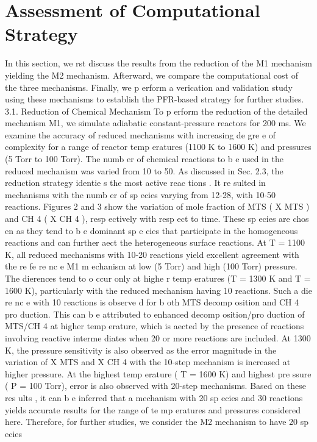 \documentclass[10pt, letterpaper]{article}
\begin{document}
\section{Assessment of Computational Strategy}
In this section, we rst discuss the results from the reduction of the M1 mechanism yielding the M2
mechanism. Afterward, we compare the computational cost of the three mechanisms. Finally, we p erform
a verication and validation study using these mechanisms to establish the PFR-based strategy for further
studies.
3.1. Reduction of Chemical Mechanism
To p erform the reduction of the detailed mechanism M1, we simulate adiabatic constant-pressure reactors
for 200 ms. We examine the accuracy of reduced mechanisms with increasing de gre e of complexity for a
range of reactor temp eratures (1100 K to 1600 K) and pressures (5 Torr to 100 Torr). The numb er of
chemical reactions to b e used in the reduced mechanism was varied from 10 to 50. As discussed in Sec. 2.3,
the reduction strategy identie s the most active reac tions . It re sulted in mechanisms with the numb er of
sp ecies varying from 12-28, with 10-50 reactions.
Figures 2 and 3 show the variation of mole fraction of MTS (
X
MTS
) and CH
4
(
X
CH
4
), resp ectively
with resp ect to time. These sp ecies are chos en as they tend to b e dominant sp e cies that participate in
the homogeneous reactions and can further aect the heterogeneous surface reactions. At T = 1100 K, all
reduced mechanisms with 10-20 reactions yield excellent agreement with the re fe re nc e M1 m echanism at
low (5 Torr) and high (100 Torr) pressure. The dierences tend to o ccur only at highe r temp eratures (T =
1300 K and T = 1600 K), particularly with the reduced mechanism having 10 reactions. Such a die re nc e
with 10 reactions is observe d for b oth MTS decomp osition and CH
4
pro duction. This can b e attributed to
enhanced decomp osition/pro duction of MTS/CH
4
at higher temp erature, which is aected by the presence of
reactions involving reactive interme diates when 20 or more reactions are included. At 1300 K, the pressure
sensitivity is also observed as the error magnitude in the variation of
X
MTS
and
X
CH
4
with the 10-step
mechanism is increased at higher pressure. At the highest temp erature (
T
= 1600 K) and highest pre ssure
(
P
= 100 Torr), error is also observed with 20-step mechanisms. Based on these res ults , it can b e inferred
that a mechanism with 20 sp ecies and 30 reactions yields accurate results for the range of te mp eratures and
pressures considered here. Therefore, for further studies, we consider the M2 mechanism to have 20 sp ecies
\end{document}
